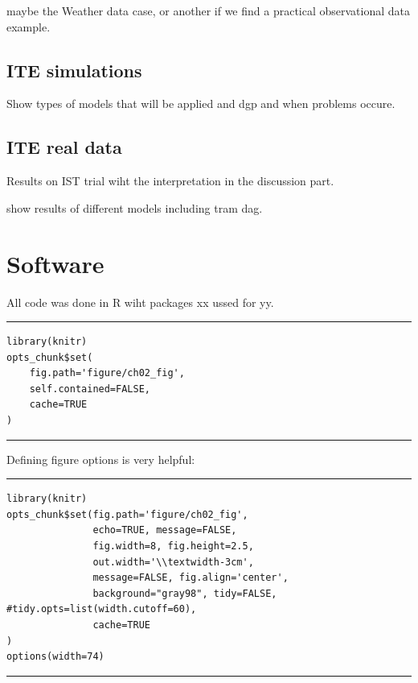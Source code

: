 maybe the Weather data case, or another if we find a practical observational data example.

\subsection{ITE simulations}

Show types of models that will be applied and dgp and when problems occure.

\subsection{ITE real data}

Results on IST trial wiht the interpretation in the discussion part.

show results of different models including tram dag.



\section{Software}

All code was done in R wiht packages xx ussed for yy.

\bigskip

\hrule
\begin{knitrout}
\color{fgcolor}\begin{kframe}
\begin{verbatim}
library(knitr)
opts_chunk$set(
    fig.path='figure/ch02_fig',
    self.contained=FALSE,
    cache=TRUE
)
\end{verbatim}
\end{kframe}
\end{knitrout}
\hrule

\bigskip

Defining figure options is very helpful:


\bigskip


\hrule
\begin{knitrout}
\color{fgcolor}\begin{kframe}
\begin{verbatim}
library(knitr)
opts_chunk$set(fig.path='figure/ch02_fig',
               echo=TRUE, message=FALSE,
               fig.width=8, fig.height=2.5,
               out.width='\\textwidth-3cm',
               message=FALSE, fig.align='center',
               background="gray98", tidy=FALSE, #tidy.opts=list(width.cutoff=60),
               cache=TRUE
)
options(width=74)
\end{verbatim}
\end{kframe}
\end{knitrout}
\hrule

